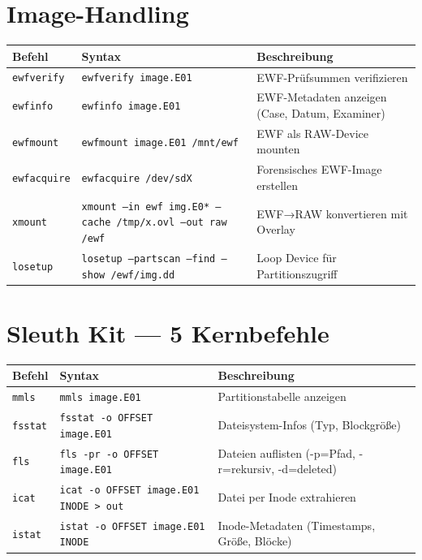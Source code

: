 \section{Image-Handling}

{\small
\begin{tabular}{@{}p{2.2cm} p{7.8cm} p{4.5cm}@{}}
\toprule
\textbf{Befehl} & \textbf{Syntax} & \textbf{Beschreibung} \\
\midrule
\texttt{ewfverify} & \texttt{ewfverify image.E01} & EWF-Prüfsummen verifizieren \\
\texttt{ewfinfo} & \texttt{ewfinfo image.E01} & EWF-Metadaten anzeigen (Case, Datum, Examiner) \\
\texttt{ewfmount} & \texttt{ewfmount image.E01 /mnt/ewf} & EWF als RAW-Device mounten \\
\texttt{ewfacquire} & \texttt{ewfacquire /dev/sdX} & Forensisches EWF-Image erstellen \\
\texttt{xmount} & \texttt{xmount --in ewf img.E0* --cache /tmp/x.ovl --out raw /ewf} & EWF→RAW konvertieren mit Overlay \\
\texttt{losetup} & \texttt{losetup --partscan --find --show /ewf/img.dd} & Loop Device für Partitionszugriff \\
\bottomrule
\end{tabular}
}

\section{Sleuth Kit — 5 Kernbefehle}

{\small
\begin{tabular}{@{}p{2.2cm} p{7.8cm} p{4.5cm}@{}}
\toprule
\textbf{Befehl} & \textbf{Syntax} & \textbf{Beschreibung} \\
\midrule
\texttt{mmls} & \texttt{mmls image.E01} & Partitionstabelle anzeigen \\
\texttt{fsstat} & \texttt{fsstat -o OFFSET image.E01} & Dateisystem-Infos (Typ, Blockgröße) \\
\texttt{fls} & \texttt{fls -pr -o OFFSET image.E01} & Dateien auflisten (-p=Pfad, -r=rekursiv, -d=deleted) \\
\texttt{icat} & \texttt{icat -o OFFSET image.E01 INODE > out} & Datei per Inode extrahieren \\
\texttt{istat} & \texttt{istat -o OFFSET image.E01 INODE} & Inode-Metadaten (Timestamps, Größe, Blöcke) \\
\bottomrule
\end{tabular}
}

